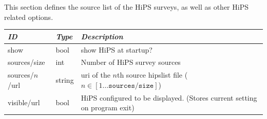 This section defines the source list of the HiPS surveys, as well as other
HiPS related options.

\noindent%
\begin{tabularx}{\textwidth}{l|l|X}\toprule
\emph{ID}     & \emph{Type} & \emph{Description}\\\midrule
show          & bool        & show HiPS at startup? \\
sources/size  & int         & Number of HiPS survey sources\\%
sources/$n$/url & string      & uri of the $n$th source hipslist file ($n \in [1 \ldots \mathtt{sources/size}]$)\\
visible/url   & bool        & HiPS configured to be displayed. (Stores current setting on program exit)\\\bottomrule
\end{tabularx}



